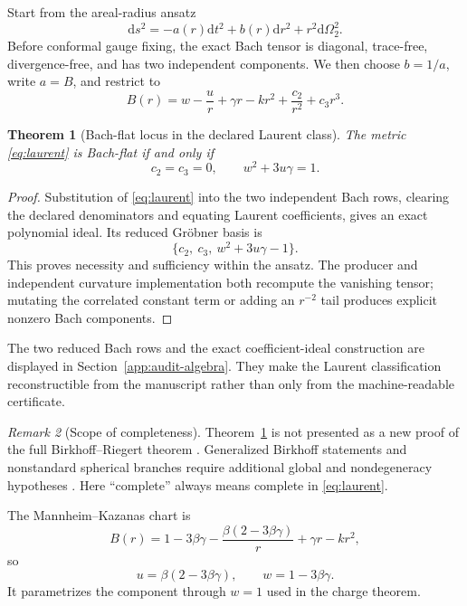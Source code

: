 \documentclass[11pt]{article}
\newtheorem{theorem}{Theorem}[section]
\theoremstyle{definition}
\theoremstyle{remark}
\newtheorem{remark}[theorem]{Remark}
\newcommand{\dd}{\mathrm d}
\begin{document}
Start from the areal-radius ansatz
\begin{equation}
 \dd s^2=-a(r)\dd t^2+b(r)\dd r^2+r^2\dd\Omega_2^2.
\end{equation}
Before conformal gauge fixing, the exact Bach tensor is diagonal,
trace-free, divergence-free, and has two independent components.  We then
choose \(b=1/a\), write \(a=B\), and restrict to
\begin{equation}\label{eq:laurent}
 B(r)=w-\frac{u}{r}+\gamma r-kr^2
      +\frac{c_2}{r^2}+c_3r^3.
\end{equation}

\begin{theorem}[Bach-flat locus in the declared Laurent class]
\label{thm:laurent}
The metric \eqref{eq:laurent} is Bach-flat if and only if
\begin{equation}\label{eq:laurent-locus}
 c_2=c_3=0,\qquad w^2+3u\gamma=1.
\end{equation}
\end{theorem}

\begin{proof}
Substitution of \eqref{eq:laurent} into the two independent Bach rows,
clearing the declared denominators and equating Laurent coefficients, gives
an exact polynomial ideal.  Its reduced Gr\"obner basis is
\[
 \{c_2,\ c_3,\ w^2+3u\gamma-1\}.
\]
This proves necessity and sufficiency within the ansatz.  The producer and
independent curvature implementation both recompute the vanishing tensor;
mutating the correlated constant term or adding an \(r^{-2}\) tail produces
explicit nonzero Bach components.
\end{proof}

The two reduced Bach rows and the exact coefficient-ideal construction are
displayed in Section~\ref{app:audit-algebra}.  They make the Laurent
classification reconstructible from the manuscript rather than only from
the machine-readable certificate.

\begin{remark}[Scope of completeness]
Theorem~\ref{thm:laurent} is not presented as a new proof of the full
Birkhoff--Riegert theorem \cite{Riegert}.  Generalized Birkhoff statements
and nonstandard spherical branches require additional global and
nondegeneracy hypotheses \cite{JizbaLeheckova}.  Here ``complete'' always
means complete in \eqref{eq:laurent}.
\end{remark}

The Mannheim--Kazanas chart is
\begin{equation}\label{eq:mk}
 B(r)=1-3\beta\gamma
      -\frac{\beta(2-3\beta\gamma)}{r}
      +\gamma r-kr^2,
\end{equation}
so
\begin{equation}\label{eq:uw}
 u=\beta(2-3\beta\gamma),\qquad
 w=1-3\beta\gamma.
\end{equation}
It parametrizes the component through \(w=1\) used in the charge theorem.
\end{document}

